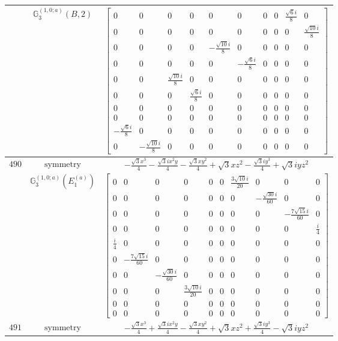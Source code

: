 \documentclass[fleqn,8pt,landscape]{jsarticle}
\begin{document}
\begin{longtable}{ccc}
$  $ & $ \mathbb{G}_{3}^{(1,0;a)}(B,2) $ & $ \begin{bmatrix} 0 & 0 & 0 & 0 & 0 & 0 & 0 & 0 & \frac{\sqrt{6} i}{8} & 0 \\ 0 & 0 & 0 & 0 & 0 & 0 & 0 & 0 & 0 & \frac{\sqrt{10} i}{8} \\ 0 & 0 & 0 & 0 & - \frac{\sqrt{10} i}{8} & 0 & 0 & 0 & 0 & 0 \\ 0 & 0 & 0 & 0 & 0 & - \frac{\sqrt{6} i}{8} & 0 & 0 & 0 & 0 \\ 0 & 0 & \frac{\sqrt{10} i}{8} & 0 & 0 & 0 & 0 & 0 & 0 & 0 \\ 0 & 0 & 0 & \frac{\sqrt{6} i}{8} & 0 & 0 & 0 & 0 & 0 & 0 \\ 0 & 0 & 0 & 0 & 0 & 0 & 0 & 0 & 0 & 0 \\ 0 & 0 & 0 & 0 & 0 & 0 & 0 & 0 & 0 & 0 \\ - \frac{\sqrt{6} i}{8} & 0 & 0 & 0 & 0 & 0 & 0 & 0 & 0 & 0 \\ 0 & - \frac{\sqrt{10} i}{8} & 0 & 0 & 0 & 0 & 0 & 0 & 0 & 0 \end{bmatrix} $ \\ \hline
$ 490 $ & $ \text{symmetry} $ & $ - \frac{\sqrt{3} x^{3}}{4} - \frac{\sqrt{3} i x^{2} y}{4} - \frac{\sqrt{3} x y^{2}}{4} + \sqrt{3} x z^{2} - \frac{\sqrt{3} i y^{3}}{4} + \sqrt{3} i y z^{2} $ \\
$  $ & $ \mathbb{G}_{3}^{(1,0;a)}(E_{1}^{(a)}) $ & $ \begin{bmatrix} 0 & 0 & 0 & 0 & 0 & 0 & \frac{3 \sqrt{10} i}{20} & 0 & 0 & 0 \\ 0 & 0 & 0 & 0 & 0 & 0 & 0 & - \frac{\sqrt{30} i}{60} & 0 & 0 \\ 0 & 0 & 0 & 0 & 0 & 0 & 0 & 0 & - \frac{7 \sqrt{15} i}{60} & 0 \\ 0 & 0 & 0 & 0 & 0 & 0 & 0 & 0 & 0 & \frac{i}{4} \\ \frac{i}{4} & 0 & 0 & 0 & 0 & 0 & 0 & 0 & 0 & 0 \\ 0 & - \frac{7 \sqrt{15} i}{60} & 0 & 0 & 0 & 0 & 0 & 0 & 0 & 0 \\ 0 & 0 & - \frac{\sqrt{30} i}{60} & 0 & 0 & 0 & 0 & 0 & 0 & 0 \\ 0 & 0 & 0 & \frac{3 \sqrt{10} i}{20} & 0 & 0 & 0 & 0 & 0 & 0 \\ 0 & 0 & 0 & 0 & 0 & 0 & 0 & 0 & 0 & 0 \\ 0 & 0 & 0 & 0 & 0 & 0 & 0 & 0 & 0 & 0 \end{bmatrix} $ \\ \hline
$ 491 $ & $ \text{symmetry} $ & $ - \frac{\sqrt{3} x^{3}}{4} + \frac{\sqrt{3} i x^{2} y}{4} - \frac{\sqrt{3} x y^{2}}{4} + \sqrt{3} x z^{2} + \frac{\sqrt{3} i y^{3}}{4} - \sqrt{3} i y z^{2} $ \\

\end{longtable}
\end{document}
